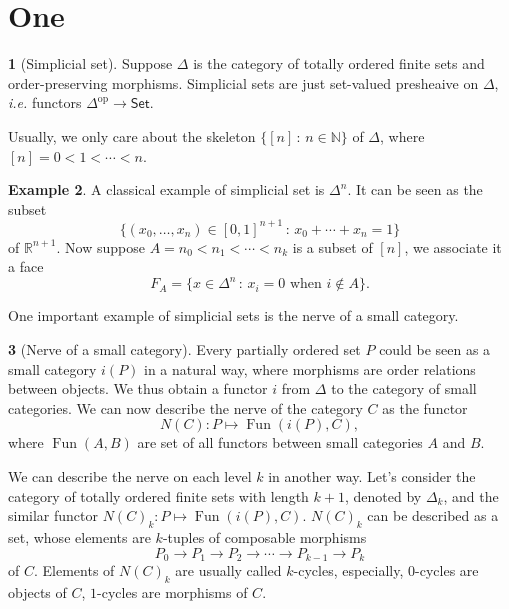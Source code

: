 \documentclass[11pt]{article}
\theoremstyle{definition}
\newtheorem{para}{}[section]
\newtheorem{exa}[para]{Example}
\theoremstyle{plain}
\begin{document}
\section{One}

\begin{para}[Simplicial set]
    Suppose $\Delta$ is the category of totally ordered finite sets and order-preserving morphisms. Simplicial sets are just set-valued presheaive on $\Delta$, {\it i.e.} functors $\Delta^{\text{op}}\to \mathsf{Set}$.
\end{para}

Usually, we only care about the skeleton $\{[n]\,:\, n\in\mathbb N\}$ of $\Delta$, where $[n]=0<1<\cdots<n$. 

\begin{exa}
    A classical example of simplicial set is $\Delta^n$. It can be seen as the subset 
    \[
        \{(x_0,\dots,x_n)\in [0,1]^{n+1}\,:\, x_0+\cdots+x_n=1\}
    \]
    of $\mathbb R^{n+1}$. Now suppose $A=n_0<n_1<\cdots<n_k$ is a subset of $[n]$, we associate it a face 
    \[
        F_A=\{x\in \Delta^n\,:\, x_i=0\text{ when $i\not\in A$}\}.
    \]
\end{exa}

One important example of simplicial sets is the nerve of a small category.

\begin{para}[Nerve of a small category]
    Every partially ordered set $P$ could be seen as a small category $i(P)$ in a natural way, where morphisms are order relations between objects. We thus obtain a functor $i$ from $\Delta$ to the category of small categories. We can now describe the nerve of the category $C$ as the functor
    \[
        N(C): P \mapsto \operatorname{Fun}(i(P),C),
    \]
    where $\operatorname{Fun}(A,B)$ are set of all functors between small categories $A$ and $B$.
\end{para}

We can describe the nerve on each level $k$ in another way. Let's consider the category of totally ordered finite sets with length $k+1$, denoted by $\Delta_k$, and the similar functor $N(C)_k: P \mapsto \operatorname{Fun}(i(P),C)$. $N(C)_k$ can be described as a set, whose elements are $k$-tuples of composable morphisms
\[
    P_0\to P_1\to P_2\to \cdots \to P_{k-1}\to P_k
\]
of $C$. Elements of $N(C)_k$ are usually called $k$-cycles, especially, $0$-cycles are objects of $C$, $1$-cycles are morphisms of $C$. 
\end{document}
